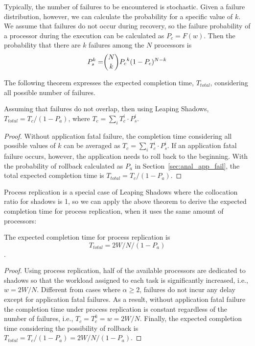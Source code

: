 Typically, the number of failures to be encountered is stochastic. Given a failure distribution, however, we can calculate the probability for a specific value of $k$. We assume that failures do not occur during recovery, so the failure probability of a processor during the execution can be calculated as $P_c = F(w)$. Then the probability that there are $k$ failures among the $N$ processors is 
\begin{equation}
\begin{split}
P_s^{k}= & \dbinom{N}{k}{P_c}^k(1-P_c)^{N-k} \\
\end{split}
\end{equation}

The following theorem expresses the expected completion time, $T_{total}$, considering all possible number of failures. 

\begin{theorem}
Assuming that failures do not overlap, then using Leaping Shadows,
$T_{total} = T_{c} / (1 - P_a)$, where $T_{c} = \sum_{i} T_{c}^{i} \cdot P_s^{i}$.
\end{theorem}
\begin{proof}
Without application fatal failure, the completion time considering all possible values of $k$ can be averaged as $T_{c} = \sum_{i} T_{c}^{i} \cdot P_s^{i}$. If an application fatal failure occurs, however, the application needs to roll back to the beginning. With the probability of rollback calculated as $P_a$ in Section~\ref{sec:anal_app_fail}, the total expected completion time is $T_{total} = T_{c} / (1 - P_a)$.
\end{proof}

Process replication is a special case of Leaping Shadows where the collocation ratio for shadows is 1, so we can apply the above theorem to derive the expected completion time for process replication, when it uses the same amount of processors:

\begin{corollary}
The expected completion time for process replication is $$T_{total} = 2W/N / (1 - P_a)$$.
\end{corollary}
\begin{proof}
Using process replication, half of the available processors are dedicated to shadows so that the workload assigned to each task is significantly increased, i.e., $w=2W/N$. Different from cases where $\alpha \ge 2$, failures do not incur any delay except for application fatal failures. 
As a result, without application fatal failure the completion time under process replication is constant regardless of the number of failures, i.e., $T_c=T_c^k=w=2W/N$. Finally, the expected completion time considering the possibility of rollback is $T_{total} = T_c / (1 - P_a) = 2W/N / (1 - P_a)$.
\end{proof}

